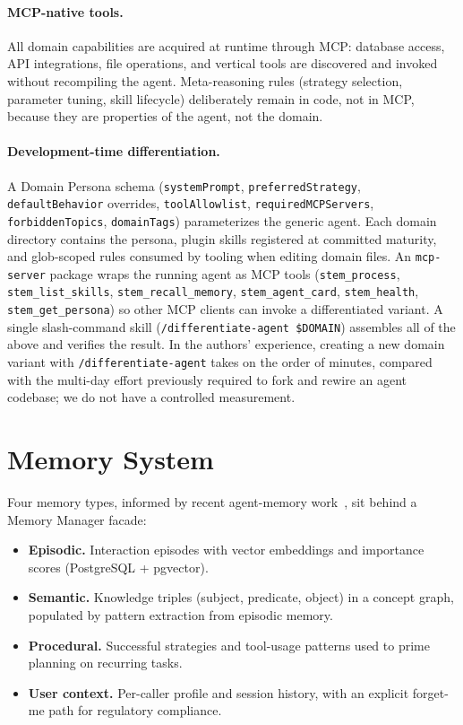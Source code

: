 \documentclass[11pt]{article}
\begin{document}
\paragraph{MCP-native tools.} All domain capabilities are acquired at runtime through MCP: database access, API integrations, file operations, and vertical tools are discovered and invoked without recompiling the agent. Meta-reasoning rules (strategy selection, parameter tuning, skill lifecycle) deliberately remain in code, not in MCP, because they are properties of the agent, not the domain.

\paragraph{Development-time differentiation.} A Domain Persona schema (\texttt{systemPrompt}, \texttt{preferredStrategy}, \texttt{defaultBehavior} overrides, \texttt{toolAllowlist}, \texttt{requiredMCPServers}, \texttt{forbiddenTopics}, \texttt{domainTags}) parameterizes the generic agent. Each domain directory contains the persona, plugin skills registered at committed maturity, and glob-scoped rules consumed by tooling when editing domain files. An \texttt{mcp-server} package wraps the running agent as MCP tools (\texttt{stem\_process}, \texttt{stem\_list\_skills}, \texttt{stem\_recall\_memory}, \texttt{stem\_agent\_card}, \texttt{stem\_health}, \texttt{stem\_get\_persona}) so other MCP clients can invoke a differentiated variant. A single slash-command skill (\texttt{/differentiate-agent \$DOMAIN}) assembles all of the above and verifies the result. In the authors' experience, creating a new domain variant with \texttt{/differentiate-agent} takes on the order of minutes, compared with the multi-day effort previously required to fork and rewire an agent codebase; we do not have a controlled measurement.

\section{Memory System}
\label{sec:memory}

Four memory types, informed by recent agent-memory work~\citep{ai2025memorybench, gallego2026memoryastool, yadav2026synapse}, sit behind a Memory Manager facade:

\begin{itemize}
\item \textbf{Episodic.} Interaction episodes with vector embeddings and importance scores (PostgreSQL + pgvector).
\item \textbf{Semantic.} Knowledge triples (subject, predicate, object) in a concept graph, populated by pattern extraction from episodic memory.
\item \textbf{Procedural.} Successful strategies and tool-usage patterns used to prime planning on recurring tasks.
\item \textbf{User context.} Per-caller profile and session history, with an explicit forget-me path for regulatory compliance.
\end{itemize}
\end{document}
